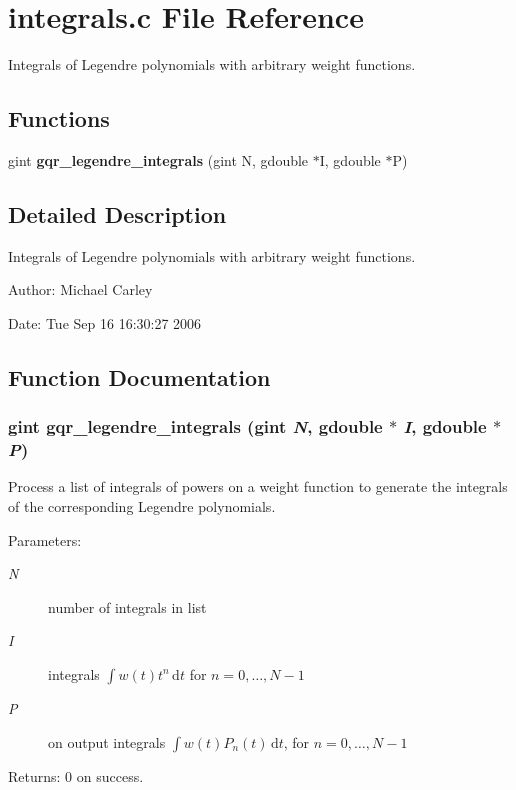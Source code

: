 \section{integrals.c File Reference}
\label{integrals_8c}
Integrals of Legendre polynomials with arbitrary weight functions. 

\subsection*{Functions}
\begin{CompactItemize}
\item 
gint {\bf gqr\_\-legendre\_\-integrals} (gint N, gdouble $\ast$I, gdouble $\ast$P)
\end{CompactItemize}


\subsection{Detailed Description}
Integrals of Legendre polynomials with arbitrary weight functions. 

\begin{Desc}
\item[Author:]Michael Carley \end{Desc}
\begin{Desc}
\item[Date:]Tue Sep 16 16:30:27 2006 \end{Desc}


\subsection{Function Documentation}
\subsubsection{\setlength{\rightskip}{0pt plus 5cm}gint gqr\_\-legendre\_\-integrals (gint {\em N}, \/  gdouble $\ast$ {\em I}, \/  gdouble $\ast$ {\em P})}\label{integrals_8c_0c8365c9ce4dd95a8779af80c77ff4d6}


Process a list of integrals of powers on a weight function to generate the integrals of the corresponding Legendre polynomials.

\begin{Desc}
\item[Parameters:]
\begin{description}
\item[{\em N}]number of integrals in list \item[{\em I}]integrals $\int w(t)t^{n}\,\mathrm{d}t$ for $n=0,\ldots,N-1$ \item[{\em P}]on output integrals $\int w(t)P_{n}(t)\,\mathrm{d}t$, for $n=0,\ldots,N-1$\end{description}
\end{Desc}
\begin{Desc}
\item[Returns:]0 on success. \end{Desc}
